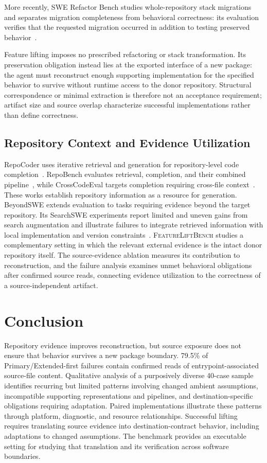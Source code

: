\documentclass[acmsmall,screen,review,anonymous]{acmart}
\newcommand{\flb}{\textsc{FeatureLiftBench}\xspace}
\begin{document}
More recently, SWE Refactor Bench studies whole-repository stack migrations and
separates migration completeness from behavioral correctness: its evaluation
verifies that the requested migration occurred in addition to testing preserved
behavior~\cite{hong2026swerefactorbench}.

Feature lifting imposes no prescribed refactoring or stack transformation. Its
preservation obligation instead lies at the exported interface of a new package:
the agent must reconstruct enough supporting implementation for the specified
behavior to survive without runtime access to the donor repository. Structural
correspondence or minimal extraction is therefore not an acceptance requirement;
artifact size and source overlap characterize successful implementations rather
than define correctness.

\subsection{Repository Context and Evidence Utilization}

RepoCoder uses iterative retrieval and generation for repository-level code
completion~\cite{zhang2023repocoder}. RepoBench evaluates retrieval, completion,
and their combined pipeline~\cite{liu2024repobench}, while CrossCodeEval targets
completion requiring cross-file context~\cite{ding2023crosscodeeval}. These works
establish repository information as a resource for generation.
BeyondSWE extends evaluation to tasks requiring evidence beyond the target
repository. Its SearchSWE experiments report limited and uneven gains from search
augmentation and illustrate failures to integrate retrieved information with
local implementation and version constraints~\cite{chen2026beyondswe}.
\flb studies a complementary setting in which the relevant external evidence is
the intact donor repository itself. The source-evidence ablation measures its
contribution to reconstruction, and the failure analysis examines unmet
behavioral obligations after confirmed source reads, connecting evidence
utilization to the correctness of a source-independent artifact.

\section{Conclusion}

Repository evidence improves reconstruction, but source exposure does not ensure
that behavior survives a new package boundary. 79.5\% of Primary/Extended-first
failures contain confirmed reads of entrypoint-associated source-file content. Qualitative analysis of a purposively diverse 40-case sample identifies
recurring but limited patterns involving changed ambient assumptions, incompatible supporting
representations and pipelines, and destination-specific obligations requiring
adaptation. Paired implementations illustrate these patterns through platform,
diagnostic, and resource relationships. Successful lifting requires translating
source evidence into destination-contract behavior, including adaptations to
changed assumptions.
The benchmark provides an executable setting for studying that translation and
its verification across software boundaries.
\end{document}
